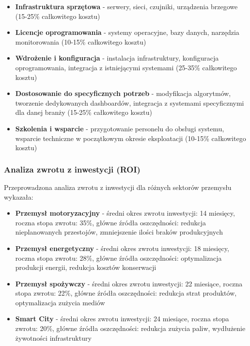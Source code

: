 \begin{itemize}
    \item \textbf{Infrastruktura sprzętowa} - serwery, sieci, czujniki, urządzenia brzegowe (15-25\% całkowitego kosztu)
    \item \textbf{Licencje oprogramowania} - systemy operacyjne, bazy danych, narzędzia monitorowania (10-15\% całkowitego kosztu)
    \item \textbf{Wdrożenie i konfiguracja} - instalacja infrastruktury, konfiguracja oprogramowania, integracja z istniejącymi systemami (25-35\% całkowitego kosztu)
    \item \textbf{Dostosowanie do specyficznych potrzeb} - modyfikacja algorytmów, tworzenie dedykowanych dashboardów, integracja z systemami specyficznymi dla danej branży (15-25\% całkowitego kosztu)
    \item \textbf{Szkolenia i wsparcie} - przygotowanie personelu do obsługi systemu, wsparcie techniczne w początkowym okresie eksploatacji (10-15\% całkowitego kosztu)
\end{itemize}

\subsubsection{Analiza zwrotu z inwestycji (ROI)}
\label{subsubsec:analiza_roi}

Przeprowadzona analiza zwrotu z inwestycji dla różnych sektorów przemysłu wykazała:

\begin{itemize}
    \item \textbf{Przemysł motoryzacyjny} - średni okres zwrotu inwestycji: 14 miesięcy, roczna stopa zwrotu: 35\%, główne źródła oszczędności: redukcja nieplanowanych przestojów, zmniejszenie ilości braków produkcyjnych
    \item \textbf{Przemysł energetyczny} - średni okres zwrotu inwestycji: 18 miesięcy, roczna stopa zwrotu: 28\%, główne źródła oszczędności: optymalizacja produkcji energii, redukcja kosztów konserwacji
    \item \textbf{Przemysł spożywczy} - średni okres zwrotu inwestycji: 22 miesiące, roczna stopa zwrotu: 22\%, główne źródła oszczędności: redukcja strat produktów, optymalizacja zużycia mediów
    \item \textbf{Smart City} - średni okres zwrotu inwestycji: 24 miesiące, roczna stopa zwrotu: 20\%, główne źródła oszczędności: redukcja zużycia paliw, wydłużenie żywotności infrastruktury
\end{itemize}

